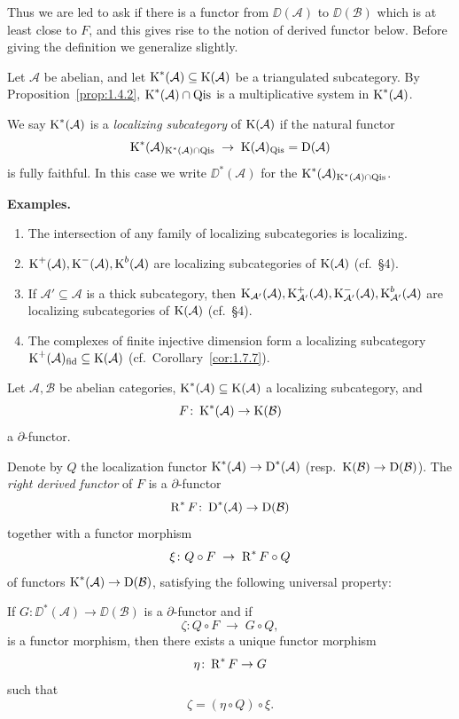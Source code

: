 Thus we are led to ask if there is a functor from $\DD(\mathcal{A})$ to $\DD(\mathcal{B})$ which is at least close to $F$, and this gives rise to the notion of derived functor below. Before giving the definition we generalize slightly.

\begin{definition*}
Let $\mathcal{A}$ be abelian, and let $\operatorname{K}^*(\mathcal{A})\subseteq\operatorname{K}(\mathcal{A})$ be a triangulated subcategory. By Proposition~\ref{prop:1.4.2}, $\operatorname{K}^*(\mathcal{A})\cap\operatorname{Qis}$ is a multiplicative system in $\operatorname{K}^*(\mathcal{A})$.

We say $\operatorname{K}^*(\mathcal{A})$ is a \emph{localizing subcategory} of $\operatorname{K}(\mathcal{A})$ if the natural functor
\[
\operatorname{K}^*(\mathcal{A})_{\operatorname{K}^*(\mathcal{A})\cap\operatorname{Qis}}
\;\to\;
\operatorname{K}(\mathcal{A})_{\operatorname{Qis}} = \operatorname{D}(\mathcal{A})
\]
is fully faithful. In this case we write $\DD^*(\mathcal{A})$ for the $\operatorname{K}^*(\mathcal{A})_{\operatorname{K}^*(\mathcal{A})\cap\operatorname{Qis}}$.
\end{definition*}

\textbf{Examples.}
\begin{enumerate}
\item The intersection of any family of localizing subcategories is localizing.
\item $\operatorname{K}^+(\mathcal{A}),\operatorname{K}^-(\mathcal{A}),\operatorname{K}^b(\mathcal{A})$ are localizing subcategories of $\operatorname{K}(\mathcal{A})$ (cf.\ \S4).
\item If $\mathcal{A}'\subseteq\mathcal{A}$ is a thick subcategory, then $\operatorname{K}_{\mathcal{A}'}(\mathcal{A}),\operatorname{K}_{\mathcal{A}'}^+(\mathcal{A}),\operatorname{K}_{\mathcal{A}'}^-(\mathcal{A}),\operatorname{K}_{\mathcal{A}'}^b(\mathcal{A})$ are localizing subcategories of $\operatorname{K}(\mathcal{A})$ (cf.\ \S4).
\item The complexes of finite injective dimension form a localizing subcategory $\operatorname{K}^+(\mathcal{A})_{\mathrm{fid}}\subseteq\operatorname{K}(\mathcal{A})$ (cf.\ Corollary~\ref{cor:1.7.7}).
\end{enumerate}

\begin{definition*}
Let $\mathcal{A},\mathcal{B}$ be abelian categories, $\operatorname{K}^*(\mathcal{A})\subseteq\operatorname{K}(\mathcal{A})$ a localizing subcategory, and
\[
F\colon\operatorname{K}^*(\mathcal{A})\to\operatorname{K}(\mathcal{B})
\]
a $\partial$-functor.

Denote by $Q$ the localization functor $\operatorname{K}^*(\mathcal{A})\to\operatorname{D}^*(\mathcal{A})$ (resp.\ $\operatorname{K}(\mathcal{B})\to\operatorname{D}(\mathcal{B})$). The \emph{right derived functor} of $F$ is a  $\partial$-functor
\[
\operatorname{R}^*F\colon\operatorname{D}^*(\mathcal{A})\to\operatorname{D}(\mathcal{B})
\]
together with a functor morphism
\[
\xi\colon Q\circ F \;\to\; \operatorname{R}^*F\circ Q
\]
of functors $\operatorname{K}^*(\mathcal{A})\to\operatorname{D}(\mathcal{B})$, satisfying the following universal property:

If $G\colon\DD^*(\mathcal{A})\to\DD(\mathcal{B})$ is a $\partial$-functor and if
\[
\zeta\colon Q\circ F \;\to\; G\circ Q,
\]
is a functor morphism, then there exists a unique functor morphism
\[
\eta\colon \operatorname{R}^*F \to G
\]
such that
\[
\zeta = (\eta\circ Q)\circ \xi.
\]
\end{definition*}

